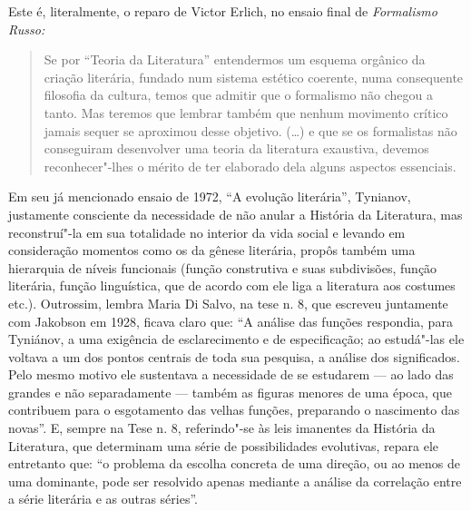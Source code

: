Este é, literalmente, o reparo de Victor Erlich, no ensaio final de
\emph{Formalismo Russo:}

\begin{quote}
Se por ``Teoria da Literatura'' entendermos um esquema orgânico da
criação literária, fundado num sistema estético coerente, numa
consequente filosofia da cultura, temos que admitir que o formalismo não
chegou a tanto. Mas teremos que lembrar também que nenhum movimento
crítico jamais sequer se aproximou desse objetivo. (\ldots{}) e que se os
formalistas não conseguiram desenvolver uma teoria da literatura
exaustiva, devemos reconhecer"-lhes o mérito de ter elaborado dela alguns
aspectos essenciais. 
\end{quote}

Em seu já mencionado ensaio de 1972, ``A evolução literária'', Tynianov,
justamente consciente da necessidade de não anular a História da
Literatura, mas reconstruí"-la em sua totalidade no interior da vida
social e levando em consideração momentos como os da gênese literária,
propôs também uma hierarquia de níveis funcionais (função construtiva e
suas subdivisões, função literária, função linguística, que de acordo
com ele liga a literatura aos costumes etc.). Outrossim, lembra Maria Di
Salvo, na tese n. 8, que escreveu juntamente com Jakobson em 1928,
ficava claro que: ``A análise das funções respondia, para Tyniánov, a
uma exigência de esclarecimento e de especificação; ao estudá"-las ele
voltava a um dos pontos centrais de toda sua pesquisa, a análise dos
significados. Pelo mesmo motivo ele sustentava a necessidade de se
estudarem --- ao lado das grandes e não separadamente --- também as figuras
menores de uma época, que contribuem para o esgotamento das velhas
funções, preparando o nascimento das novas''. E, sempre na Tese n. 8,
referindo"-se às leis imanentes da História da Literatura, que determinam
uma série de possibilidades evolutivas, repara ele entretanto que: ``o
problema da escolha concreta de uma direção, ou ao menos de uma
dominante, pode ser resolvido apenas mediante a análise da correlação
entre a série literária e as outras séries''.


